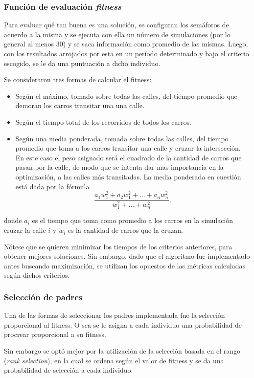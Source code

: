 \documentclass[colorinlistoftodos,twoside,twocolumn]{article} %
\begin{document}
	\subsubsection{Función de evaluación \textit{fitness}}
	
	Para evaluar qu\'e tan buena es una soluci\'on, se configuran los sem\'aforos de acuerdo a la misma y se ejecuta con ella un n\'umero de simulaciones (por lo general al menos 30) y se saca informaci\'on como promedio de las mismas. Luego, con los resultados arrojados por esta en un per\'iodo determinado y bajo el criterio escogido, se le da una puntuaci\'on a dicho individuo.
	
	Se consideraron tres formas de calcular el fitness:
	\begin{itemize}
		\item Seg\'un el m\'aximo, tomado sobre todas las calles, del tiempo promedio que demoran los carros transitar una una calle. 
		\item Seg\'un el tiempo total de los recorridos de todos los carros. 
		\item Seg\'un una media ponderada, tomada sobre todas las calles, del tiempo promedio que toma a los carros transitar una calle y cruzar la intersecci\'on. En este caso el peso asignado ser\'a el cuadrado de la cantidad de carros que pasan por la calle, de modo que se intenta dar mas importancia en la optimizaci\'on, a las calles m\'as transitadas. La media ponderada en cuesti\'on est\'a dada por la f\'ormula
		\[ \frac{a_1w_1^2 + a_2w_1^2 + \dots + a_nw_n^2}{w_1^2 + \dots + w_n^2},\]
	\end{itemize}
	donde $a_i$ es el tiempo que toma como promedio a los carros en la simulaci\'on cruzar la calle $i$ y $w_i$ es la cantidad de carros que la cruzan.

	N\'otese que se quieren minimizar los tiempos de los criterios anteriores, para obtener mejores soluciones. Sin embargo, dado que el algoritmo fue implementado antes buscando maximizaci\'on, se utilizan los opuestos de las m\'etricas calculadas seg\'un dichos criterios.
	
	\subsubsection{Selección de padres}
	Una de las formas de seleccionar los padres implementada fue la selecci\'on proporcional al fitness. O sea se le asigna a cada individuo una probabilidad de procrear proporcional a su fitness.
	
	Sin embargo se opt\'o mejor por la utilizaci\'on de la selección basada en el rango (\textit{rank selection}), en la cual se ordena según el valor de fitness y se da una probabilidad de selección a cada individuo. 
	
\end{document}
